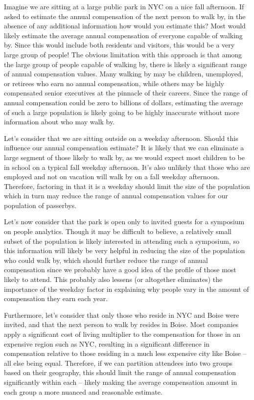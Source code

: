 \documentclass[]{book}
\begin{document}
Imagine we are sitting at a large public park in NYC on a nice fall afternoon. If asked to estimate the annual compensation of the next person to walk by, in the absence of any additional information how would you estimate this? Most would likely estimate the average annual compensation of everyone capable of walking by. Since this would include both residents and visitors, this would be a very large group of people! The obvious limitation with this approach is that among the large group of people capable of walking by, there is likely a significant range of annual compensation values. Many walking by may be children, unemployed, or retirees who earn no annual compensation, while others may be highly compensated senior executives at the pinnacle of their careers. Since the range of annual compensation could be zero to billions of dollars, estimating the average of such a large population is likely going to be highly inaccurate without more information about who may walk by.

Let's consider that we are sitting outside on a weekday afternoon. Should this influence our annual compensation estimate? It is likely that we can eliminate a large segment of those likely to walk by, as we would expect most children to be in school on a typical fall weekday afternoon. It's also unlikely that those who are employed and not on vacation will walk by on a fall weekday afternoon. Therefore, factoring in that it is a weekday should limit the size of the population which in turn may reduce the range of annual compensation values for our population of passerbys.

Let's now consider that the park is open only to invited guests for a symposium on people analytics. Though it may be difficult to believe, a relatively small subset of the population is likely interested in attending such a symposium, so this information will likely be very helpful in reducing the size of the population who could walk by, which should further reduce the range of annual compensation since we probably have a good idea of the profile of those most likely to attend. This probably also lessens (or altogether eliminates) the importance of the weekday factor in explaining why people vary in the amount of compensation they earn each year.

Furthermore, let's consider that only those who reside in NYC and Boise were invited, and that the next person to walk by resides in Boise. Most companies apply a significant cost of living multiplier to the compensation for those in an expensive region such as NYC, resulting in a significant difference in compensation relative to those residing in a much less expensive city like Boise -- all else being equal. Therefore, if we can partition attendees into two groups based on their geography, this should limit the range of annual compensation significantly within each -- likely making the average compensation amount in each group a more nuanced and reasonable estimate.
\end{document}

